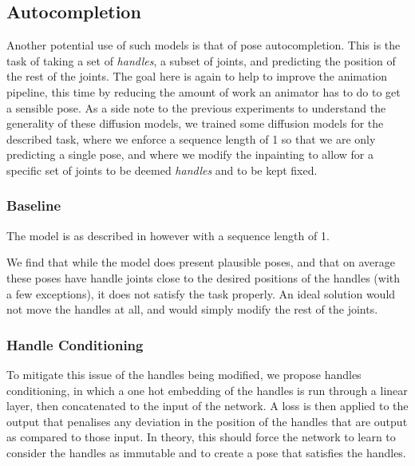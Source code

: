 
\subsection{Autocompletion}
\label{sec:autocomplete}

Another potential use of such models is that of pose autocompletion. This is the task of taking a set of \textit{handles}, a subset of joints, and predicting the position of the rest of the joints. The goal here is again to help to improve the animation pipeline, this time by reducing the amount of work an animator has to do to get a sensible pose. As a side note to the previous experiments to understand the generality of these diffusion models, we trained some diffusion models for the described task, where we enforce a sequence length of 1 so that we are only predicting a single pose, and where we modify the inpainting to allow for a specific set of joints to be deemed \textit{handles} and to be kept fixed.

\subsubsection{Baseline}
The model is as described in  however with a sequence length of 1.

We find that while the model does present plausible poses, and that on average these poses have handle joints close to the desired positions of the handles (with a few exceptions), it does not satisfy the task properly.  An ideal solution would not move the handles at all, and would simply modify the rest of the joints.



\subsubsection{Handle Conditioning}
To mitigate this issue of the handles being modified, we propose handles conditioning, in which a one hot embedding of the handles is run through a linear layer, then concatenated to the input of the network. A loss is then applied to the output that penalises any deviation in the position of the handles that are output as compared to those input. In theory, this should force the network to learn to consider the handles as immutable and to create a pose that satisfies the handles.

